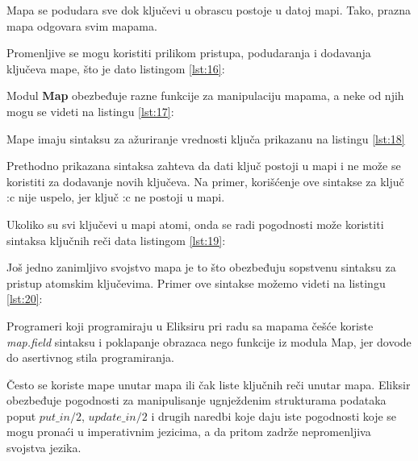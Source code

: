 \documentclass[12pt,oneside]{memoir}
\begin{document}


Mapa se podudara sve dok ključevi u obrascu postoje u datoj mapi. Tako, prazna mapa odgovara svim mapama.

Promenljive se mogu koristiti prilikom pristupa, podudaranja i dodavanja ključeva mape, što je dato listingom \ref{lst:16}:



Modul \textbf{Map} obezbeđuje razne funkcije za manipulaciju mapama, a neke od njih mogu se videti na listingu \ref{lst:17}:



Mape imaju sintaksu za ažuriranje vrednosti ključa prikazanu na listingu \ref{lst:18}



Prethodno prikazana sintaksa zahteva da dati ključ postoji u mapi i ne može se koristiti za dodavanje novih ključeva. Na primer, korišćenje ove sintakse za ključ :c nije uspelo, jer ključ :c ne postoji u mapi.

Ukoliko su svi ključevi u mapi atomi, onda se radi pogodnosti može koristiti sintaksa ključnih reči data listingom \ref{lst:19}:



Još jedno zanimljivo svojstvo mapa je to što obezbeđuju sopstvenu sintaksu za pristup atomskim ključevima. Primer ove sintakse možemo videti na listingu \ref{lst:20}:



Programeri koji programiraju u Eliksiru pri radu sa mapama češće koriste \textit{map.field} sintaksu i poklapanje obrazaca nego funkcije iz modula Map, jer dovode do asertivnog stila programiranja.

Često se koriste mape unutar mapa ili čak liste ključnih reči unutar mapa. Eliksir obezbeđuje pogodnosti za manipulisanje ugnježdenim strukturama podataka poput $put\_in/2$, $update\_in/2$ i drugih naredbi koje daju iste pogodnosti koje se mogu pronaći u imperativnim jezicima, a da pritom zadrže nepromenljiva svojstva jezika.
\end{document}
